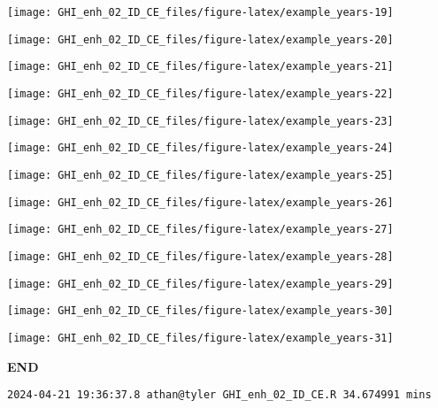 \documentclass[
  10pt,
  a4paper,oneside]{article}
\begin{document}
\begin{center}\texttt{[image: GHI\_enh\_02\_ID\_CE\_files/figure-latex/example\_years-19]} \end{center}

\begin{center}\texttt{[image: GHI\_enh\_02\_ID\_CE\_files/figure-latex/example\_years-20]} \end{center}

\begin{center}\texttt{[image: GHI\_enh\_02\_ID\_CE\_files/figure-latex/example\_years-21]} \end{center}

\begin{center}\texttt{[image: GHI\_enh\_02\_ID\_CE\_files/figure-latex/example\_years-22]} \end{center}

\begin{center}\texttt{[image: GHI\_enh\_02\_ID\_CE\_files/figure-latex/example\_years-23]} \end{center}

\begin{center}\texttt{[image: GHI\_enh\_02\_ID\_CE\_files/figure-latex/example\_years-24]} \end{center}

\begin{center}\texttt{[image: GHI\_enh\_02\_ID\_CE\_files/figure-latex/example\_years-25]} \end{center}

\begin{center}\texttt{[image: GHI\_enh\_02\_ID\_CE\_files/figure-latex/example\_years-26]} \end{center}

\begin{center}\texttt{[image: GHI\_enh\_02\_ID\_CE\_files/figure-latex/example\_years-27]} \end{center}

\begin{center}\texttt{[image: GHI\_enh\_02\_ID\_CE\_files/figure-latex/example\_years-28]} \end{center}

\begin{center}\texttt{[image: GHI\_enh\_02\_ID\_CE\_files/figure-latex/example\_years-29]} \end{center}

\begin{center}\texttt{[image: GHI\_enh\_02\_ID\_CE\_files/figure-latex/example\_years-30]} \end{center}

\begin{center}\texttt{[image: GHI\_enh\_02\_ID\_CE\_files/figure-latex/example\_years-31]} \end{center}

\textbf{END}

\begin{verbatim}
2024-04-21 19:36:37.8 athan@tyler GHI_enh_02_ID_CE.R 34.674991 mins
\end{verbatim}
\end{document}
